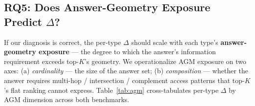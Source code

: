 \documentclass[review]{elsarticle}
\begin{document}
\subsection{RQ5: Does Answer-Geometry Exposure Predict \texorpdfstring{$\Delta$}{Delta}?}
\label{sec:rq5}

If our diagnosis is correct, the per-type $\Delta$ should scale with each type's \textbf{answer-geometry exposure} --- the degree to which the answer's information requirement exceeds top-$K$'s geometry. We operationalize AGM exposure on two axes: (a) \emph{cardinality} --- the size of the answer set; (b) \emph{composition} --- whether the answer requires multi-hop / intersection / complement access patterns that top-$K$'s flat ranking cannot express. Table~\ref{tab:agm} cross-tabulates per-type $\Delta$ by AGM dimension across both benchmarks.
\end{document}
